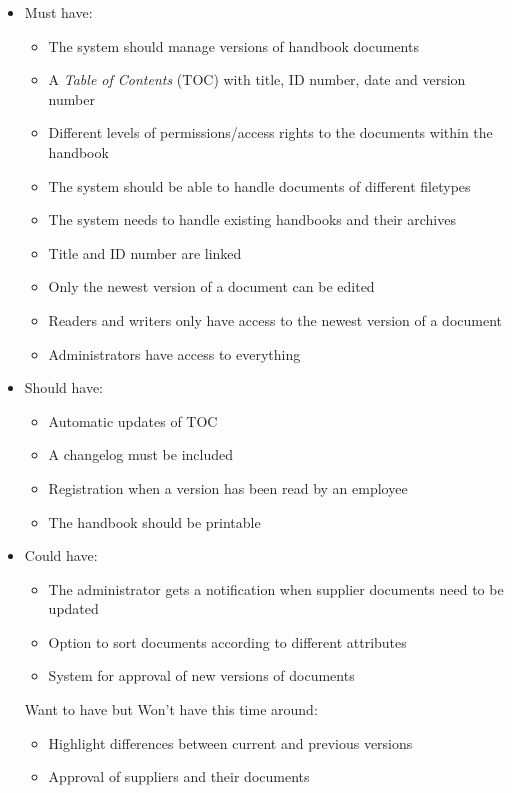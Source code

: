 \begin{itemize}
        \item Must have:
        \begin{itemize}
                \item The system should manage versions of handbook documents
                \item A \textit{Table of Contents} (TOC) with title, ID number, date and version number
                \item Different levels of permissions/access rights to the documents within the handbook
                \item The system should be able to handle documents of different filetypes
                \item The system needs to handle existing handbooks and their archives
                \item Title and ID number are linked
                \item Only the newest version of a document can be edited
                \item Readers and writers only have access to the newest version of a document
                \item Administrators have access to everything
        \end{itemize}
        \item Should have:
        \begin{itemize}
                \item Automatic updates of TOC
                \item A changelog must be included
                \item Registration when a version has been read by an employee
                \item The handbook should be printable
        \end{itemize}
        \item Could have:
        \begin{itemize}
                \item The administrator gets a notification when supplier documents need to be updated
                \item Option to sort documents according to different attributes
                \item System for approval of new versions of documents
        \end{itemize}
        \tem Want to have but Won't have this time around:
        \begin{itemize}
                \item Highlight differences between current and previous versions
                \item Approval of suppliers and their documents
        \end{itemize}
\end{itemize}

